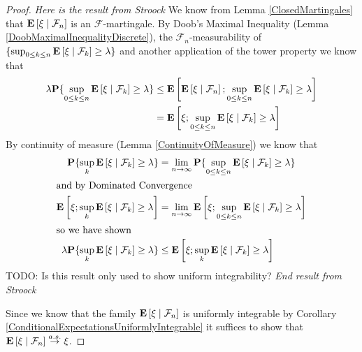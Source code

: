 \begin{proof}
\emph{Here is the result from Stroock}
We know from Lemma \ref{ClosedMartingales} that
$\textbf{E}\left[ \xi \mid \mathcal{F}_n \right]$ is an
$\mathcal{F}$-martingale.  By Doob's Maximal Inequality (Lemma
\ref{DoobMaximalInequalityDiscrete}), the
$\mathcal{F}_n$-measurability of  $\lbrace \sup_{0 \leq k
    \leq n}\textbf{E}\left[ \xi \mid \mathcal{F}_k \right] \geq \lambda \rbrace$ and another application of the
tower property we know that 
\begin{align*}
\lambda \textbf{P}\{\sup_{0 \leq k \leq n}
  \textbf{E}\left[ \xi \mid \mathcal{F}_k \right] \geq \lambda\} &\leq
\textbf{E}\left[\textbf{E}\left[ \xi \mid \mathcal{F}_n \right]; \sup_{0 \leq k
    \leq n}\textbf{E}\left[ \xi \mid \mathcal{F}_k \right] \geq \lambda\right] \\
&= \textbf{E}\left[\xi; \sup_{0 \leq k
    \leq n}\textbf{E}\left[ \xi \mid \mathcal{F}_k \right] \geq \lambda\right]
\end{align*}
By continuity of measure (Lemma \ref{ContinuityOfMeasure}) we know
that 
\begin{align*}
\textbf{P}\{\sup_{k}
  \textbf{E}\left[ \xi \mid \mathcal{F}_k \right] \geq \lambda\} &= \lim_{n \to \infty} \textbf{P}\{\sup_{0 \leq k \leq n}
  \textbf{E}\left[ \xi \mid \mathcal{F}_k \right] \geq \lambda\} \\
\intertext{and by Dominated Convergence}
\textbf{E}\left[\xi; \sup_{k}\textbf{E}\left[ \xi \mid \mathcal{F}_k \right] \geq \lambda\right] &=
\lim_{n \to \infty} \textbf{E}\left[\xi; \sup_{0 \leq k
    \leq n}\textbf{E}\left[ \xi \mid \mathcal{F}_k \right] \geq \lambda\right] \\
\intertext{so we have shown}
\lambda \textbf{P}\{\sup_{k}
  \textbf{E}\left[ \xi \mid \mathcal{F}_k \right] \geq \lambda\} &\leq
\textbf{E}\left[\xi; \sup_{k}\textbf{E}\left[ \xi \mid \mathcal{F}_k \right] \geq \lambda\right]
\end{align*}
TODO: Is this result only used to show uniform integrability?
\emph{End result from Stroock}

Since we know that the family $\textbf{E}\left[ \xi \mid \mathcal{F}_n \right]$
is uniformly integrable by Corollary
\ref{ConditionalExpectationsUniformlyIntegrable} it suffices to show
that $\textbf{E}\left[ \xi \mid \mathcal{F}_n \right] \overset{a.s.}\to \xi$.


\end{proof}
